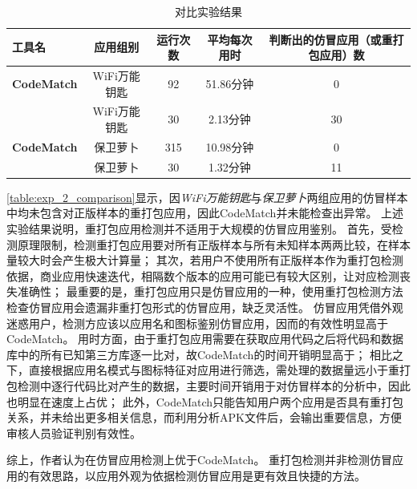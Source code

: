 \begin{table}[htbp]
    \renewcommand{\arraystretch}{1}
    \footnotesize
    \centering
    \caption{对比实验结果}
    \vspace{1mm}
    \begin{tabular}{l cccc}
        \toprule
        {\bf 工具名}                     & 应用组别     & 运行次数 & 平均每次用时 & 判断出的仿冒应用（或重打包应用）数 \\
        \midrule
        {\bf CodeMatch}                  & WiFi万能钥匙 & 92       & 51.86分钟    & 0                                  \\
        \rowcolor{gray!15}{\bf \mytool } & WiFi万能钥匙 & 30       & 2.13分钟     & 30                                 \\
        {\bf CodeMatch}                  & 保卫萝卜     & 315      & 10.98分钟    & 0                                  \\
        \rowcolor{gray!15}{\bf \mytool } & 保卫萝卜     & 30       & 1.32分钟     & 11                                 \\

        \bottomrule
    \end{tabular}
    \label{table:exp_2_comparison}
\end{table}

\autoref{table:exp_2_comparison}显示，因\textit{WiFi万能钥匙}与\textit{保卫萝卜}两组应用的仿冒样本中均未包含对正版样本的重打包应用，因此CodeMatch并未能检查出异常。
上述实验结果说明，重打包应用检测并不适用于大规模的仿冒应用鉴别。
首先，受检测原理限制，检测重打包应用要对所有正版样本与所有未知样本两两比较，在样本量较大时会产生极大计算量；
其次，若用户不使用所有正版样本作为重打包检测依据，商业应用快速迭代，相隔数个版本的应用可能已有较大区别，让对应检测丧失准确性；
最重要的是，重打包应用只是仿冒应用的一种，使用重打包检测方法检查仿冒应用会遗漏非重打包形式的仿冒应用，缺乏灵活性。
仿冒应用凭借外观迷惑用户，检测方应该以应用名和图标鉴别仿冒应用，因而\mytool 的有效性明显高于CodeMatch。
用时方面，由于重打包应用需要在获取应用代码之后将代码和数据库中的所有已知第三方库逐一比对，故CodeMatch的时间开销明显高于\mytool ；
相比之下，\mytool 直接根据应用名模式与图标特征对应用进行筛选，需处理的数据量远小于重打包检测中逐行代码比对产生的数据，主要时间开销用于对仿冒样本的分析中，因此也明显在速度上占优；
此外，CodeMatch只能告知用户两个应用是否具有重打包关系，并未给出更多相关信息，而\mytool 利用\componentC 分析APK文件后，会输出重要信息，方便审核人员验证判别有效性。

综上，作者认为\mytool 在仿冒应用检测上优于CodeMatch。
重打包检测并非检测仿冒应用的有效思路，以应用外观为依据检测仿冒应用是更有效且快捷的方法。

